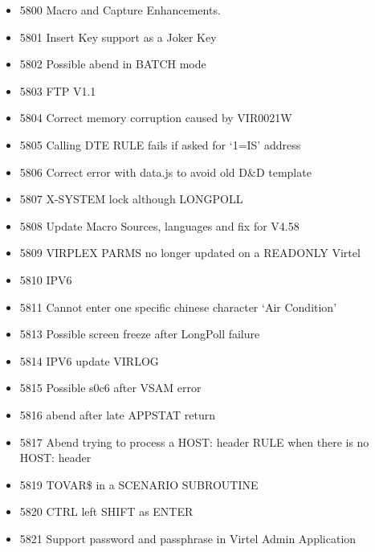 \documentclass[letterpaper,10pt,english]{sphinxmanual}
\begin{document}
\begin{itemize}
\item {} 
5800 Macro and Capture Enhancements.

\item {} 
5801 Insert Key support as a Joker Key

\item {} 
5802 Possible abend in BATCH mode

\item {} 
5803 FTP V1.1

\item {} 
5804 Correct memory corruption caused by VIR0021W

\item {} 
5805 Calling DTE RULE fails if asked for ‘1=IS’ address

\item {} 
5806 Correct error with data.js to avoid old D\&D template

\item {} 
5807 X-SYSTEM lock although LONGPOLL

\item {} 
5808 Update Macro Sources, languages and fix for V4.58

\item {} 
5809 VIRPLEX PARMS no longer updated on a READONLY Virtel

\item {} 
5810 IPV6

\item {} 
5811 Cannot enter one specific chinese character ‘Air Condition’

\item {} 
5813 Possible screen freeze after LongPoll failure

\item {} 
5814 IPV6 update VIRLOG

\item {} 
5815 Possible s0c6 after VSAM error

\item {} 
5816 abend after late APPSTAT return

\item {} 
5817 Abend trying to process a HOST: header RULE when there is no HOST: header

\item {} 
5819 TOVAR\$ in a SCENARIO SUBROUTINE

\item {} 
5820 CTRL left SHIFT as ENTER

\item {} 
5821 Support password and passphrase in Virtel Admin Application


\end{itemize}
\end{document}
